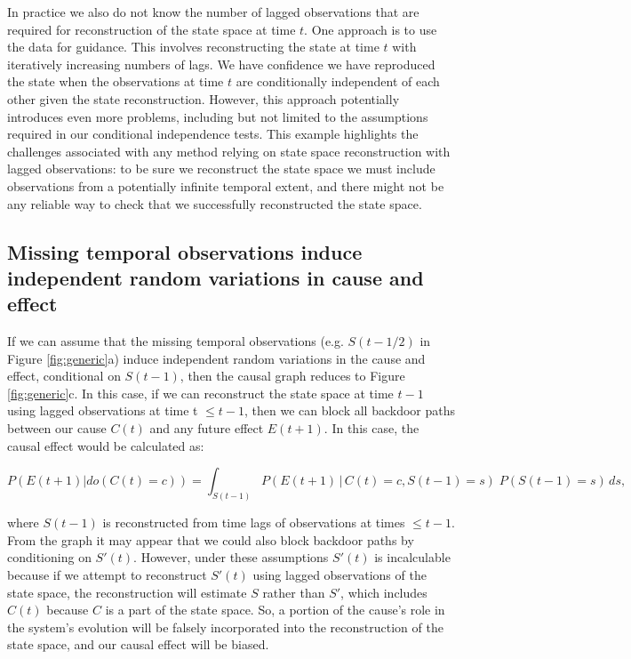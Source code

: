 \documentclass[12pt]{article}
\begin{document}
In practice we also do not know the number of lagged observations that
are required for reconstruction of the state space at time $t$. One
approach is to use the data for guidance. This involves reconstructing
the state at time $t$ with iteratively increasing numbers of lags. We
have confidence we have reproduced the state when the observations at
time $t$ are conditionally independent of each other given the state
reconstruction. However, this approach potentially introduces even
more problems, including but not limited to the assumptions required
in our conditional independence tests. This example highlights the
challenges associated with any method relying on state space
reconstruction with lagged observations: to be sure we reconstruct the
state space we must include observations from a potentially infinite
temporal extent, and there might not be any reliable way to check that
we successfully reconstructed the state space.

\subsection{Missing temporal observations induce independent random
  variations in cause and effect}
\label{sec:miss-temp-observ}

If we can assume that the missing temporal observations
(e.g. $S(t-1/2)$ in Figure \ref{fig:generic}a) induce independent
random variations in the cause and effect, conditional on $S(t-1)$,
then the causal graph reduces to Figure \ref{fig:generic}c. In this
case, if we can reconstruct the state space at time $t-1$ using lagged
observations at time t $\leq t-1$, then we can block all backdoor
paths between our cause $C(t)$ and any future effect $E(t+1)$. In this
case, the causal effect would be calculated as:

\begin{equation}
  P(E(t+1)| do(C(t)=c)) = \int_{S(t-1)} P(E(t+1) \, | \, C(t)=c,
  S(t-1) = s
  )\; P(S(t-1)=s) \, d s,
\end{equation}

where $S(t-1)$ is reconstructed from time lags of observations at
times $\leq t-1$. From the graph it may appear that we could also
block backdoor paths by conditioning on $S'(t)$. However, under these
assumptions $S'(t)$ is incalculable because if we attempt to
reconstruct $S'(t)$ using lagged observations of the state space, the
reconstruction will estimate $S$ rather than $S'$, which includes
$C(t)$ because $C$ is a part of the state space. So, a portion of the
cause's role in the system's evolution will be falsely incorporated
into the reconstruction of the state space, and our causal effect will
be biased.
\end{document}
